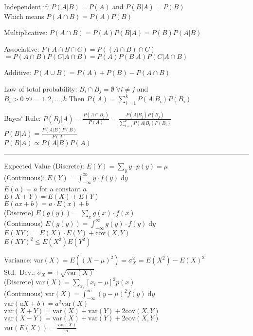 \documentclass[notitlepage,10pt,twocolumn]{article}
\begin{document}
Independent if: $P(A|B) = P(A)$ and $P(B|A) = P(B)$\\ Which means $P(A\cap B)=P(A)P(B)$

Multiplicative: $P(A\cap B) = P(A)P(B|A) = P(B)P(A|B)$

Associative: $P(A\cap B\cap C) =P((A\cap B)\cap C)$\\ $=P(A\cap B)P(C|A\cap B) = P(A)P(B|A)P(C|A\cap B)$

Additive: $P(A\cup B) = P(A) + P(B) - P(A\cap B)$

Law of total probability: $B_i \cap B_j = \emptyset\; \forall i \ne j$ and \\ $B_i > 0\; \forall i=1,2,\dots,k$ Then $P(A)=\sum_{i=1}^k P(A|B_i)P(B_i)$

Bayes` Rule: $P(B_j | A) = \frac{P(A\cap B_j)}{P(A)} = \frac{P(A|B_j)P(B_j)}{\sum_{i=1}^k P(A|B_i)P(B_i)}$\\
	$P(B|A) = \frac{P(A|B)P(B)}{P(A)}$\\
	$P(B|A) \propto P(A|B)P(A)$

\vspace{.2cm} \hrule \vspace{.2cm}

Expected Value (Discrete): $E(Y) = \sum_y  y \cdot p(y) = \mu$\\
	(Continuous): $E(Y) = \int_{-\infty}^{\infty} y\cdot f(y)\;\textrm{d}y$\\
	$E(a) = a$ for a constant $a$\\
	$E(X+Y) = E(X)+E(Y)$\\
	$E(ax+b) = a\cdot E(x)+b$\\
	(Discrete) $E(g(y)) = \sum_x g(x)\cdot f(x)$\\
	(Continuous) $E(g(y)) = \int_{-\infty}^{\infty} g(y)\cdot f(y)\; \textrm{d}y$\\
	$E(XY) = E(X)\cdot E(Y) + \text{cov}(X,Y)$\\
	$E(XY)^2 \le E(X^2)E(Y^2)$

Variance: var$(X) = E((X-\mu)^2) = \sigma_X^2 = E(X^2) - E(X)^2$\\
	Std.\ Dev.: $\sigma_X = +\sqrt{\text{var}(X)}$\\
	(Discrete) var$(X) = \sum_{x_i} [x_i-\mu]^2 p(x)$\\
	(Continuous) var$(X) = \int_{-\infty}^{\infty} (y-\mu)^2f(y)\; \textrm{d}y$\\
	$\text{var}(aX +b) = a^2\text{var}(X)$\\
	$\text{var}(X +Y) = \text{var}(X) + \text{var}(Y) + 2\text{cov}(X,Y)$\\
	$\text{var}(X -Y) = \text{var}(X) + \text{var}(Y)+ 2\text{cov}(X,Y)$\\
	var$(E(X)) = \frac{\text{var}(X)}{n}$
\end{document}
